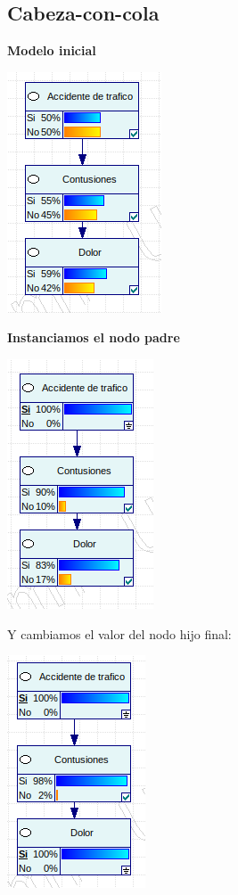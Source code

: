 \documentclass{article}
\begin{document}
\subsection{\textbf{Cabeza-con-cola}}

\textbf{Modelo inicial}

\begin{center}
\includegraphics[scale=0.5]{1c1.png}
\end{center}

\textbf{Instanciamos el nodo padre}

\begin{center}
\includegraphics[scale=0.5]{1c2.png}
\end{center}

Y cambiamos el valor del nodo hijo final:

\begin{center}
\includegraphics[scale=0.5]{1c3.png}
\end{center}
\end{document}
